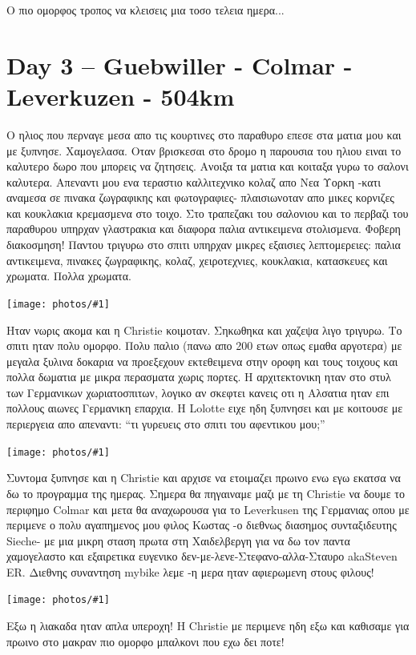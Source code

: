 \documentclass[11pt, letterpaper]{book}
\newcommand\photo[1]{\noindent\texttt{[image: photos/\#1]}}
\begin{document}
Ο πιο ομορφος τροπος να κλεισεις μια τοσο τελεια ημερα...

\chapter{Day 3 -- Guebwiller - Colmar - Leverkuzen - 504km}

Ο ηλιος που περναγε μεσα απο τις κουρτινες στο παραθυρο επεσε στα ματια μου και με ξυπνησε. Χαμογελασα. Οταν βρισκεσαι στο δρομο η παρουσια του ηλιου ειναι το καλυτερο δωρο που μπορεις να ζητησεις.
Ανοιξα τα ματια και κοιταξα γυρω το σαλονι καλυτερα. Απεναντι μου ενα τεραστιο καλλιτεχνικο κολαζ απο Νεα Υορκη -κατι αναμεσα σε πινακα ζωγραφικης και φωτογραφιες- πλαισιωνοταν απο μικες κορνιζες και κουκλακια κρεμασμενα στο τοιχο.
Στο τραπεζακι του σαλονιου και το περβαζι του παραθυρου υπηρχαν γλαστρακια και διαφορα παλια αντικειμενα στολισμενα. Φοβερη διακοσμηση! Παντου τριγυρω στο σπιτι υπηρχαν μικρες εξαισιες λεπτομερειες: παλια αντικειμενα, πινακες ζωγραφικης, κολαζ, χειροτεχνιες, κουκλακια, κατασκευες και χρωματα. Πολλα χρωματα.

\photo{80.jpg}

Ηταν νωρις ακομα και η Christie κοιμοταν. Σηκωθηκα και χαζεψα λιγο τριγυρω.
Το σπιτι ηταν πολυ ομορφο. Πολυ παλιο (πανω απο 200 ετων οπως εμαθα αργοτερα) με μεγαλα ξυλινα δοκαρια να προεξεχουν εκτεθειμενα στην οροφη και τους τοιχους και πολλα δωματια με μικρα περασματα χωρις πορτες. Η αρχιτεκτονικη ηταν στο στυλ των Γερμανικων χωριατοσπιτων, λογικο αν σκεφτει κανεις οτι η Αλσατια ηταν επι πολλους αιωνες Γερμανικη επαρχια.
Η Lolotte ειχε ηδη ξυπνησει και με κοιτουσε με περιεργεια απο απεναντι: ``τι γυρευεις στο σπιτι του αφεντικου μου;''

\photo{81.jpg}

Συντομα ξυπνησε και η Christie και αρχισε να ετοιμαζει πρωινο ενω εγω εκατσα να δω το προγραμμα της ημερας.
Σημερα θα πηγαιναμε μαζι με τη Christie να δουμε το περιφημο Colmar και μετα θα αναχωρουσα για το Leverkusen της Γερμανιας οπου με περιμενε ο πολυ αγαπημενος μου φιλος Κωστας -ο διεθνως διασημος συνταξιδευτης Sieche- με μια μικρη σταση πρωτα στη Χαιδελβεργη για να δω τον παντα χαμογελαστο και εξαιρετικα ευγενικο δεν-με-λενε-Στεφανο-αλλα-Σταυρο akaSteven ER.
Διεθνης συναντηση mybike λεμε -η μερα ηταν αφιερωμενη στους φιλους!

\photo{82.jpg}

Εξω η λιακαδα ηταν απλα υπεροχη! Η Christie με περιμενε ηδη εξω και καθισαμε για πρωινο στο μακραν πιο ομορφο μπαλκονι που εχω δει ποτε!
\end{document}
